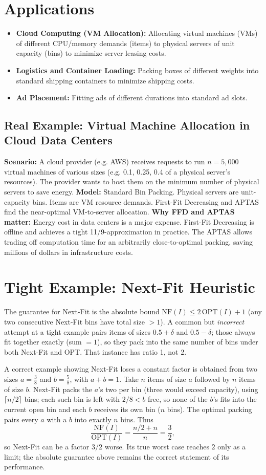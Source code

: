 \section{Applications}
\begin{itemize}
    \item \textbf{Cloud Computing (VM Allocation):} Allocating virtual machines (VMs) of different CPU/memory demands (items) to physical servers of unit capacity (bins) to minimize server leasing costs.
    \item \textbf{Logistics and Container Loading:} Packing boxes of different weights into standard shipping containers to minimize shipping costs.
    \item \textbf{Ad Placement:} Fitting ads of different durations into standard ad slots.
\end{itemize}

\subsection*{Real Example: Virtual Machine Allocation in Cloud Data Centers}
\textbf{Scenario:} A cloud provider (e.g. AWS) receives requests to run $n=5,000$ virtual machines of various sizes (e.g. 0.1, 0.25, 0.4 of a physical server's resources). The provider wants to host them on the minimum number of physical servers to save energy.
\textbf{Model:} Standard Bin Packing. Physical servers are unit-capacity bins. Items are VM resource demands. First-Fit Decreasing and APTAS find the near-optimal VM-to-server allocation.
\textbf{Why FFD and APTAS matter:} Energy cost in data centers is a major expense. First-Fit Decreasing is offline and achieves a tight 11/9-approximation in practice. The APTAS allows trading off computation time for an arbitrarily close-to-optimal packing, saving millions of dollars in infrastructure costs.

\section{Tight Example: Next-Fit Heuristic}
The guarantee for Next-Fit is the absolute bound $\text{NF}(I) \le 2\,\text{OPT}(I) + 1$ (any two consecutive Next-Fit bins have total size $> 1$). A common but \emph{incorrect} attempt at a tight example pairs items of sizes $0.5+\delta$ and $0.5-\delta$; those always fit together exactly (sum $= 1$), so they pack into the same number of bins under both Next-Fit and OPT. That instance has ratio 1, not 2.

A correct example showing Next-Fit loses a constant factor is obtained from two sizes $a = \frac38$ and $b = \frac58$, with $a + b = 1$. Take $n$ items of size $a$ followed by $n$ items of size $b$.
Next-Fit packs the $a$'s two per bin (three would exceed capacity), using $\lceil n/2 \rceil$ bins; each such bin is left with $2/8 < b$ free, so none of the $b$'s fits into the current open bin and each $b$ receives its own bin ($n$ bins). The optimal packing pairs every $a$ with a $b$ into exactly $n$ bins. Thus
\[
\frac{\text{NF}(I)}{\text{OPT}(I)} = \frac{n/2 + n}{n} = \frac32 ,
\]
so Next-Fit can be a factor $3/2$ worse. Its true worst case reaches $2$ only as a limit; the absolute guarantee above remains the correct statement of its performance.

